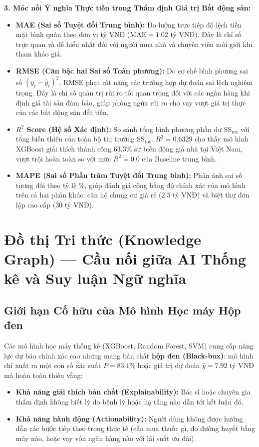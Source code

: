 \documentclass[12pt,a4paper]{report}
\begin{document}
\textbf{3. Móc nối Ý nghĩa Thực tiễn trong Thẩm định Giá trị Bất động sản:}
\begin{itemize}[leftmargin=1.5em]
    \item \textbf{MAE (Sai số Tuyệt đối Trung bình):} Đo lường trực tiếp độ lệch tiền mặt bình quân theo đơn vị tỷ VNĐ ($\text{MAE} = 1.02$ tỷ VNĐ). Đây là chỉ số trực quan và dễ hiểu nhất đối với người mua nhà và chuyên viên môi giới khi tham khảo giá.
    \item \textbf{RMSE (Căn bậc hai Sai số Toàn phương):} Do cơ chế bình phương sai số $(y_i - \hat{y}_i)^2$, RMSE phạt rất nặng các trường hợp dự đoán sai lệch nghiêm trọng. Đây là chỉ số quản trị rủi ro tối quan trọng đối với các ngân hàng khi định giá tài sản đảm bảo, giúp phòng ngừa rủi ro cho vay vượt giá trị thực của các bất động sản đắt tiền.
    \item \textbf{$R^2$ Score (Hệ số Xác định):} So sánh tổng bình phương phần dư $\text{SS}_{\text{res}}$ với tổng biến thiên của toàn bộ thị trường $\text{SS}_{\text{tot}}$. $R^2 = 0.6329$ cho thấy mô hình XGBoost giải thích thành công $63.3\%$ sự biến động giá nhà tại Việt Nam, vượt trội hoàn toàn so với mức $R^2 = 0.0$ của Baseline trung bình.
    \item \textbf{MAPE (Sai số Phần trăm Tuyệt đối Trung bình):} Phản ánh sai số tương đối theo tỷ lệ \%, giúp đánh giá công bằng độ chính xác của mô hình trên cả hai phân khúc: căn hộ chung cư giá rẻ ($2.5$ tỷ VNĐ) và biệt thự đơn lập cao cấp ($30$ tỷ VNĐ).
\end{itemize}

\section{Đồ thị Tri thức (Knowledge Graph) — Cầu nối giữa AI Thống kê và Suy luận Ngữ nghĩa}

\subsection{Giới hạn Cố hữu của Mô hình Học máy Hộp đen}
Các mô hình học máy thống kê (XGBoost, Random Forest, SVM) cung cấp năng lực dự báo chính xác cao nhưng mang bản chất \textbf{hộp đen (Black-box)}: mô hình chỉ xuất ra một con số xác suất $P=83.1\%$ hoặc giá trị dự đoán $\hat{y} = 7.92$ tỷ VNĐ mà hoàn toàn thiếu vắng:
\begin{itemize}[leftmargin=1.5em]
    \item \textbf{Khả năng giải thích bản chất (Explainability):} Bác sĩ hoặc chuyên gia thẩm định không biết lý do bệnh lý hoặc hạ tầng nào dẫn tới kết luận đó.
    \item \textbf{Khả năng hành động (Actionability):} Người dùng không được hướng dẫn các bước tiếp theo trong thực tế (cần mua thuốc gì, đo đường huyết bằng máy nào, hoặc vay vốn ngân hàng nào với lãi suất ưu đãi).
\end{itemize}
\end{document}
